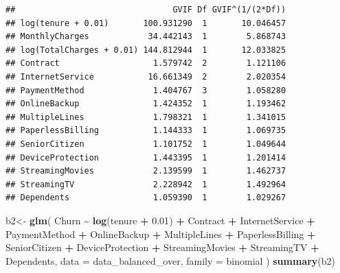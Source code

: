 \documentclass[
  twoside]{article}
\newenvironment{Shaded}{\begin{snugshade}}{\end{snugshade}}
\newcommand{\AttributeTok}[1]{\textcolor[rgb]{0.13,0.29,0.53}{#1}}
\newcommand{\FloatTok}[1]{\textcolor[rgb]{0.00,0.00,0.81}{#1}}
\newcommand{\FunctionTok}[1]{\textcolor[rgb]{0.13,0.29,0.53}{\textbf{#1}}}
\newcommand{\NormalTok}[1]{#1}
\newcommand{\OtherTok}[1]{\textcolor[rgb]{0.56,0.35,0.01}{#1}}
\newcommand{\SpecialCharTok}[1]{\textcolor[rgb]{0.81,0.36,0.00}{\textbf{#1}}}
\begin{document}
\begin{verbatim}
##                                GVIF Df GVIF^(1/(2*Df))
## log(tenure + 0.01)       100.931290  1       10.046457
## MonthlyCharges            34.442143  1        5.868743
## log(TotalCharges + 0.01) 144.812944  1       12.033825
## Contract                   1.579742  2        1.121106
## InternetService           16.661349  2        2.020354
## PaymentMethod              1.404767  3        1.058280
## OnlineBackup               1.424352  1        1.193462
## MultipleLines              1.798321  1        1.341015
## PaperlessBilling           1.144333  1        1.069735
## SeniorCitizen              1.101752  1        1.049644
## DeviceProtection           1.443395  1        1.201414
## StreamingMovies            2.139599  1        1.462737
## StreamingTV                2.228942  1        1.492964
## Dependents                 1.059390  1        1.029267
\end{verbatim}

\begin{Shaded}
\begin{Highlighting}[]
\NormalTok{b2}\OtherTok{\textless{}{-}} \FunctionTok{glm}\NormalTok{(}
\NormalTok{  Churn }\SpecialCharTok{\textasciitilde{}} \FunctionTok{log}\NormalTok{(tenure }\SpecialCharTok{+} \FloatTok{0.01}\NormalTok{)}
  \SpecialCharTok{+}\NormalTok{ Contract  }\SpecialCharTok{+}\NormalTok{ InternetService }\SpecialCharTok{+}\NormalTok{ PaymentMethod }
  \SpecialCharTok{+}\NormalTok{ OnlineBackup }\SpecialCharTok{+}\NormalTok{ MultipleLines }\SpecialCharTok{+}\NormalTok{ PaperlessBilling }\SpecialCharTok{+}\NormalTok{ SeniorCitizen }
   \SpecialCharTok{+}\NormalTok{ DeviceProtection }\SpecialCharTok{+}\NormalTok{ StreamingMovies }\SpecialCharTok{+}\NormalTok{ StreamingTV }
  \SpecialCharTok{+}\NormalTok{ Dependents,}
  \AttributeTok{data =}\NormalTok{ data\_balanced\_over,}
  \AttributeTok{family =}\NormalTok{ binomial}
\NormalTok{)}
\FunctionTok{summary}\NormalTok{(b2)}
\end{Highlighting}
\end{Shaded}
\end{document}
